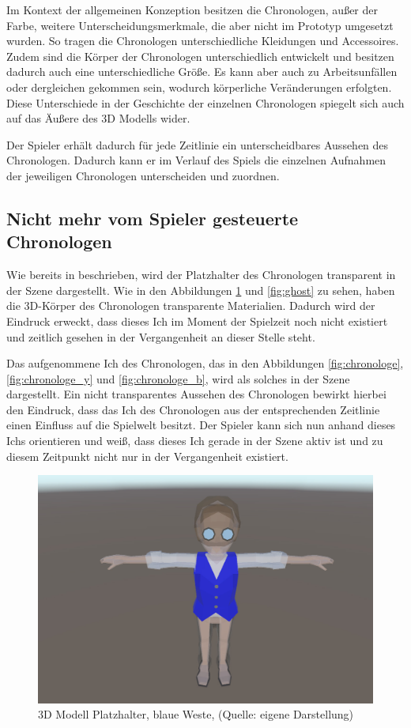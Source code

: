 Im Kontext der allgemeinen Konzeption besitzen die Chronologen, außer der Farbe, weitere Unterscheidungsmerkmale, die aber nicht im Prototyp umgesetzt wurden. So tragen die Chronologen unterschiedliche Kleidungen und Accessoires. Zudem sind die Körper der Chronologen unterschiedlich entwickelt und besitzen dadurch auch eine unterschiedliche Größe. Es kann aber auch zu Arbeitsunfällen oder dergleichen gekommen sein, wodurch körperliche Veränderungen erfolgten. Diese Unterschiede in der Geschichte der einzelnen Chronologen spiegelt sich auch auf das Äußere des \ac{3D} Modells wider. 

Der Spieler erhält dadurch für jede Zeitlinie ein unterscheidbares Aussehen des Chronologen. Dadurch kann er im Verlauf des Spiels die einzelnen Aufnahmen der jeweiligen Chronologen unterscheiden und zuordnen.

\subsection{Nicht mehr vom Spieler gesteuerte Chronologen}
Wie bereits in  beschrieben, wird der Platzhalter des Chronologen transparent in der Szene dargestellt. Wie in den Abbildungen \ref{fig:ghost_b} und \ref{fig:ghost} zu sehen, haben die \ac{3D}-Körper des Chronologen transparente Materialien. Dadurch wird der Eindruck erweckt, dass dieses Ich im Moment der Spielzeit noch nicht existiert und zeitlich gesehen in der Vergangenheit an dieser Stelle steht.

Das aufgenommene Ich des Chronologen, das in den Abbildungen \ref{fig:chronologe}, \ref{fig:chronologe_y} und \ref{fig:chronologe_b}, wird als solches in der Szene dargestellt. Ein nicht transparentes Aussehen des Chronologen bewirkt hierbei den Eindruck, dass das Ich des Chronologen aus der entsprechenden Zeitlinie einen Einfluss auf die Spielwelt besitzt. Der Spieler kann sich nun anhand dieses Ichs orientieren und weiß, dass dieses Ich gerade in der Szene aktiv ist und zu diesem Zeitpunkt nicht nur in der Vergangenheit existiert.
\begin{figure}[ht]
\centering
\includegraphics[width=0.8\linewidth]{content/pictures/Ghost_b.jpg}
\caption{3D Modell Platzhalter, blaue Weste, (Quelle: eigene Darstellung)}
\label{fig:ghost_b}
\end{figure}

